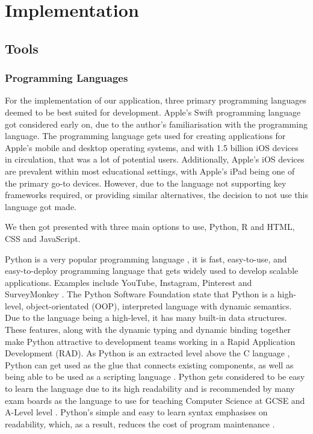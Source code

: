 \chapter{Implementation}
	\label{chap:implementation}
	
	\section{Tools}
	
	\subsection{Programming Languages}
	
	For the implementation of our application, three primary programming languages deemed to be best suited for development. Apple's Swift programming language \cite{swift} got considered early on, due to the author's familiarisation with the programming language. The programming language gets used for creating applications for Apple's mobile and desktop operating systems, and with 1.5 billion \cite{9to5mac} iOS devices in circulation, that was a lot of potential users. Additionally, Apple's iOS devices are prevalent within most educational settings, with Apple's iPad being one of the primary go-to devices. However, due to the language not supporting key frameworks required, or providing similar alternatives, the decision to not use this language got made. 
	
	We then got presented with three main options to use, Python, R and HTML, CSS and JavaScript.
	
	Python is a very popular programming language \cite{wired_python, sof_dev_servay20}, it is fast, easy-to-use, and easy-to-deploy programming language that gets widely used to develop scalable applications. Examples include YouTube, Instagram, Pinterest and SurveyMonkey \cite{hackr.io}. The Python Software Foundation state that Python is a high-level, object-orientated (OOP), interpreted language with dynamic semantics. Due to the language being a high-level, it has many built-in data structures. These features, along with the dynamic typing and dynamic binding together make Python attractive to development teams working in a Rapid Application Development (RAD). As Python is an extracted level above the C language \cite{sto_cpython}, Python can get used as the glue that connects existing components, as well as being able to be used as a scripting language \cite{python_desc}. Python gets considered to be easy to learn the language due to its high readability and is recommended by many exam boards as the language to use for teaching Computer Science at GCSE and A-Level level \cite{list exam boards here}. Python's simple and easy to learn syntax emphasises on readability, which, as a result, reduces the cost of program maintenance \cite{python_desc, pyqt_rbc}. 
	
